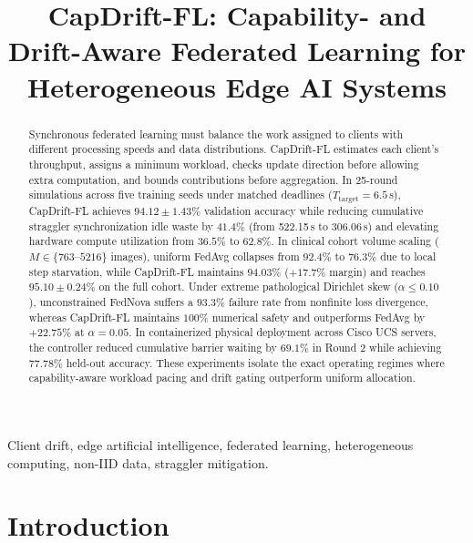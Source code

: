 \documentclass[conference]{IEEEtran}
\begin{document}
\title{CapDrift-FL: Capability- and Drift-Aware Federated Learning for Heterogeneous Edge AI Systems}

\author{
}

\maketitle

\begin{abstract}
Synchronous federated learning must balance the work assigned to clients with different processing speeds and data distributions. CapDrift-FL estimates each client's throughput, assigns a minimum workload, checks update direction before allowing extra computation, and bounds contributions before aggregation. In 25-round simulations across five training seeds under matched deadlines ($T_{\mathrm{target}}=6.5$\,s), CapDrift-FL achieves $94.12\pm1.43\%$ validation accuracy while reducing cumulative straggler synchronization idle waste by $41.4\%$ (from 522.15\,s to 306.06\,s) and elevating hardware compute utilization from $36.5\%$ to $62.8\%$. In clinical cohort volume scaling ($M \in \{763\text{--}5216\}$ images), uniform FedAvg collapses from $92.4\%$ to $76.3\%$ due to local step starvation, while CapDrift-FL maintains $94.03\%$ ($+17.7\%$ margin) and reaches $95.10\pm0.24\%$ on the full cohort. Under extreme pathological Dirichlet skew ($\alpha \le 0.10$), unconstrained FedNova suffers a $93.3\%$ failure rate from nonfinite loss divergence, whereas CapDrift-FL maintains $100\%$ numerical safety and outperforms FedAvg by $+22.75\%$ at $\alpha=0.05$. In containerized physical deployment across Cisco UCS servers, the controller reduced cumulative barrier waiting by $69.1\%$ in Round 2 while achieving $77.78\%$ held-out accuracy. These experiments isolate the exact operating regimes where capability-aware workload pacing and drift gating outperform uniform allocation.
\end{abstract}

\begin{IEEEkeywords}
Client drift, edge artificial intelligence, federated learning, heterogeneous computing, non-IID data, straggler mitigation.
\end{IEEEkeywords}


\section{Introduction}
\label{sec:intro}
\end{document}
